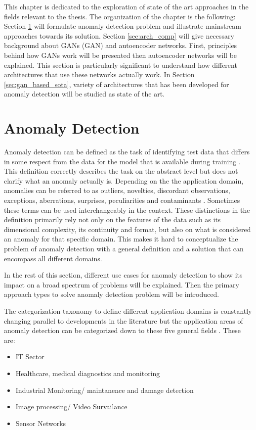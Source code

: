 \begingroup


This chapter is dedicated to the exploration of state of the art approaches in the fields relevant
to the thesis. The organization of the chapter is the following: Section \ref{sec:ad} 
will formulate anomaly detection problem and illustrate mainstream approaches towards its solution. 
Section \ref{sec:arch_comp} will give necessary background about GANs 
(GAN) and autoencoder networks. First, principles behind how GANs work will be presented then 
autoencoder networks will be explained. This section is particularly significant to understand 
how different architectures that use these networks actually work. In Section \ref{sec:gan_based_sota}, 
variety of architectures that has been developed for anomaly detection will be studied as state 
of the art.

\section{Anomaly Detection}
\label{sec:ad}
Anomaly detection can be defined as the task of identifying test data that differs in some respect 
from the data for the model that is available during training \cite{Pimentel:2014:RRN:2588908.2589196}.
This definition correctly describes the task on the abstract level but does not clarify what an anomaly 
actually is. Depending on the the application domain, anomalies can be referred to as outliers, 
novelties, discordant observations, exceptions, aberrations, surprises, peculiarities and
contaminants \cite{Chandola:2009:ADS:1541880.1541882}. Sometimes these terms can be used interchangeably in
the context. These distinctions in the definition primarily rely not only on the features of
the data such as its dimensional complexity, its continuity and format, but also on what is
considered an anomaly for that specific domain. This makes it hard to conceptualize the problem of
anomaly detection with a general definition and a solution that can encompass all different
domains.

In the rest of this section, different use cases for anomaly detection to show its
impact on a broad spectrum of problems will be explained. Then the primary approach types to solve anomaly detection problem will be introduced.

The categorization taxonomy to define different application domains is constantly changing 
parallel to developments in the literature but the application areas of 
anomaly detection can be categorized down to these five general fields
\cite{Pimentel:2014:RRN:2588908.2589196}.
These are:
\begin{itemize}
    \item IT Sector 
    \item Healthcare, medical diagnostics and monitoring
    \item Industrial Monitoring/ maintanence and damage detection
    \item Image processing/ Video Survailance
    \item Sensor Networks
\end{itemize}

